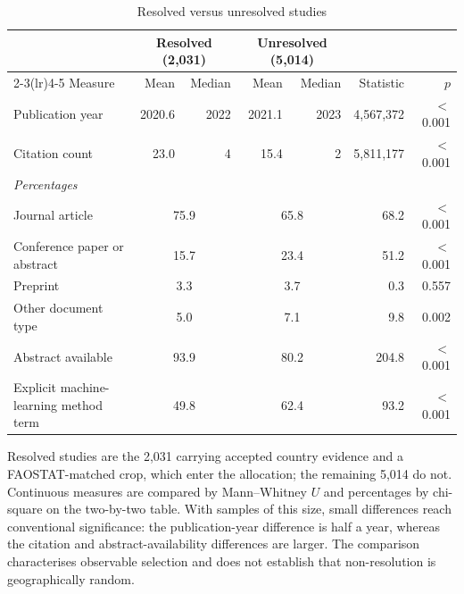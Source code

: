 \begin{table}[!t]
\centering
\footnotesize
\caption{Resolved versus unresolved studies}
\label{tab:resolution}
\begin{tabular*}{\textwidth}{@{\extracolsep\fill}l r r r r r r@{}}
\toprule
& \multicolumn{2}{c}{Resolved (2,031)} & \multicolumn{2}{c}{Unresolved (5,014)} & & \\
\cmidrule(lr){2-3}\cmidrule(lr){4-5}
Measure & Mean & Median & Mean & Median & Statistic & $p$ \\
\midrule
Publication year & 2020.6 & 2022 & 2021.1 & 2023 & 4,567,372 & $<$0.001 \\
Citation count & 23.0 & 4 & 15.4 & 2 & 5,811,177 & $<$0.001 \\
\midrule
\multicolumn{7}{l}{\textit{Percentages}} \\
Journal article & \multicolumn{2}{c}{75.9} & \multicolumn{2}{c}{65.8} & 68.2 & $<$0.001 \\
Conference paper or abstract & \multicolumn{2}{c}{15.7} & \multicolumn{2}{c}{23.4} & 51.2 & $<$0.001 \\
Preprint & \multicolumn{2}{c}{3.3} & \multicolumn{2}{c}{3.7} & 0.3 & 0.557 \\
Other document type & \multicolumn{2}{c}{5.0} & \multicolumn{2}{c}{7.1} & 9.8 & 0.002 \\
Abstract available & \multicolumn{2}{c}{93.9} & \multicolumn{2}{c}{80.2} & 204.8 & $<$0.001 \\
Explicit machine-learning method term & \multicolumn{2}{c}{49.8} & \multicolumn{2}{c}{62.4} & 93.2 & $<$0.001 \\
\bottomrule
\end{tabular*}
\begin{tablenotes}
\item[] Resolved studies are the 2,031 carrying accepted country evidence and a FAOSTAT-matched crop, which enter the allocation; the remaining 5,014 do not. Continuous measures are compared by Mann--Whitney $U$ and percentages by chi-square on the two-by-two table. With samples of this size, small differences reach conventional significance: the publication-year difference is half a year, whereas the citation and abstract-availability differences are larger. The comparison characterises observable selection and does not establish that non-resolution is geographically random.
\end{tablenotes}
\end{table}
